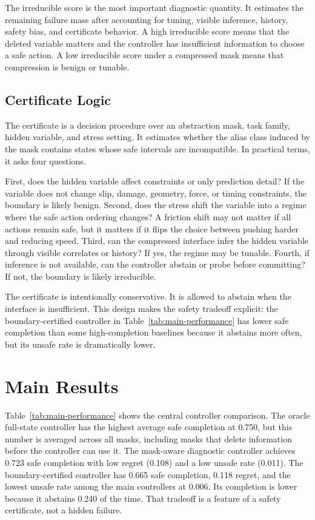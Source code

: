 \documentclass{article}
\begin{document}
The irreducible score is the most important diagnostic quantity. It estimates
the remaining failure mass after accounting for tuning, visible inference,
history, safety bias, and certificate behavior. A high irreducible score means
that the deleted variable matters and the controller has insufficient information
to choose a safe action. A low irreducible score under a compressed mask means
that compression is benign or tunable.

\subsection{Certificate Logic}

The certificate is a decision procedure over an abstraction mask, task family,
hidden variable, and stress setting. It estimates whether the alias class induced
by the mask contains states whose safe intervals are incompatible. In practical
terms, it asks four questions.

First, does the hidden variable affect constraints or only prediction detail? If
the variable does not change slip, damage, geometry, force, or timing constraints,
the boundary is likely benign. Second, does the stress shift the variable into a
regime where the safe action ordering changes? A friction shift may not matter
if all actions remain safe, but it matters if it flips the choice between pushing
harder and reducing speed. Third, can the compressed interface infer the hidden
variable through visible correlates or history? If yes, the regime may be
tunable. Fourth, if inference is not available, can the controller abstain or
probe before committing? If not, the boundary is likely irreducible.

The certificate is intentionally conservative. It is allowed to abstain when the
interface is insufficient. This design makes the safety tradeoff explicit: the
boundary-certified controller in Table~\ref{tab:main-performance} has lower safe
completion than some high-completion baselines because it abstains more often,
but its unsafe rate is dramatically lower.

\section{Main Results}



Table~\ref{tab:main-performance} shows the central controller comparison. The
oracle full-state controller has the highest average safe completion at 0.750,
but this number is averaged across all masks, including masks that delete
information before the controller can use it. The mask-aware diagnostic controller
achieves 0.723 safe completion with low regret (0.108) and a low unsafe rate
(0.011). The boundary-certified controller has 0.665 safe completion, 0.118
regret, and the lowest unsafe rate among the main controllers at 0.006. Its
completion is lower because it abstains 0.240 of the time. That tradeoff is a
feature of a safety certificate, not a hidden failure.
\end{document}
